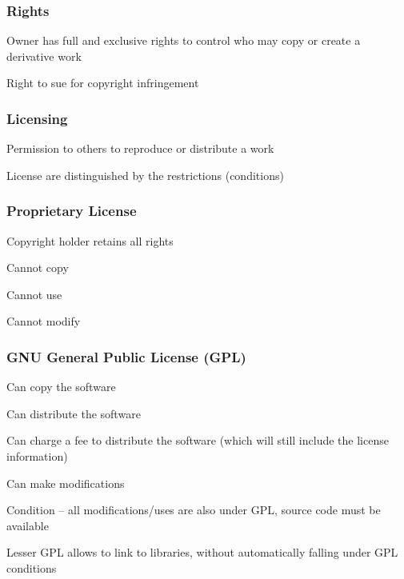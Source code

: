 \documentclass[t,12pt,numbers,fleqn]{beamer}
\begin{document}

\begin{frame}
\frametitle{Rights}

\bi
\item Owner has full and exclusive rights to control who may copy or create a
  derivative work
\item Right to sue for copyright infringement
\ei

\end{frame}


\begin{frame}
\frametitle{Licensing}

\bi
\item Permission to others to reproduce or distribute a work
\item License are distinguished by the restrictions (conditions)
\ei

\end{frame}


\begin{frame}
\frametitle{Proprietary License}

\bi
\item Copyright holder retains all rights
\item Cannot copy
\item Cannot use
\item Cannot modify
\ei

\end{frame}


\begin{frame}
\frametitle{GNU General Public License (GPL)}

\bi
\item Can copy the software
\item Can distribute the software
\item Can charge a fee to distribute the software (which will still include the license information)
\item Can make modifications
\item Condition -- all modifications/uses are also under GPL, source
  code must be available
\item Lesser GPL allows to link to libraries, without automatically falling under
  GPL conditions
\ei

\end{frame}
\end{document}

